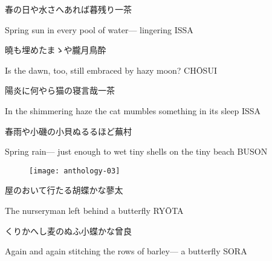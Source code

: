 \begin{haiku}
    {\FH 春の日や水さへあれば暮残り}\hfill{\FH 一茶}

    \vin{} Spring sun
    \vin{} \vin{} in every pool of water---
    \vin{} \vin{} \vin{} lingering \hspace{\fill} ISSA
\end{haiku}

\begin{haiku}
    {\FH 曉も埋めたまゝや朧月}\hfill{\FH 鳥酔}

    \vin{} Is the dawn, too,
    \vin{} \vin{} still embraced by
    \vin{} \vin{} \vin{} hazy moon? \hspace{\fill} CH\={O}SUI
\end{haiku}

\begin{haiku}
    {\FH 陽炎に何やら猫の寝言哉}\hfill{\FH 一茶}

    \vin{} In the shimmering haze
    \vin{} \vin{} the cat mumbles something
    \vin{} \vin{} \vin{} in its sleep \hspace{\fill} ISSA
\end{haiku}

\begin{haiku}
    {\FH 春雨や小磯の小貝ぬるるほど}\hfill{\FH 蕪村}

    \vin{} Spring rain---
    \vin{} \vin{} just enough to wet tiny shells
    \vin{} \vin{} \vin{} on the tiny beach \hspace{\fill} BUSON
\end{haiku}

\begin{figure}
    \texttt{[image: anthology-03]}
\end{figure}

\begin{haiku}
    {\FH {}屋のおいて行たる胡蝶かな}\hfill{\FH 蓼太}

    \vin{} The nurseryman
    \vin{} \vin{} left behind
    \vin{} \vin{} \vin{} a butterfly \hspace{\fill} RY\={O}TA
\end{haiku}

\begin{haiku}
    {\FH くりかへし麦のぬふ小蝶かな}\hfill{\FH 曾良}

    \vin{} Again and again
    \vin{} \vin{} stitching the rows of barley---
    \vin{} \vin{} \vin{} a butterfly \hspace{\fill} SORA
\end{haiku}

